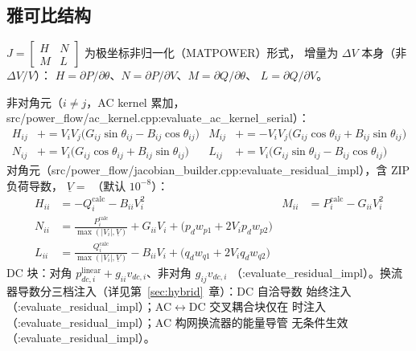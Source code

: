 \subsection{雅可比结构}
$J=\begin{bmatrix}H&N\\ M&L\end{bmatrix}$ 为极坐标非归一化（MATPOWER）形式，
增量为 $\Delta V$ 本身（非 $\Delta V/V$）：
$H=\partial P/\partial\theta$、$N=\partial P/\partial V$、$M=\partial Q/\partial\theta$、
$L=\partial Q/\partial V$。

非对角元（$i\neq j$，AC kernel 累加，src/power\_flow/ac\_kernel.cpp:evaluate\_ac\_kernel\_serial）：
\begin{align*}
H_{ij}&\mathrel{+}=V_iV_j\big(G_{ij}\sin\theta_{ij}-B_{ij}\cos\theta_{ij}\big) &
M_{ij}&\mathrel{+}=-V_iV_j\big(G_{ij}\cos\theta_{ij}+B_{ij}\sin\theta_{ij}\big)\\
N_{ij}&\mathrel{+}=V_i\big(G_{ij}\cos\theta_{ij}+B_{ij}\sin\theta_{ij}\big) &
L_{ij}&\mathrel{+}=V_i\big(G_{ij}\sin\theta_{ij}-B_{ij}\cos\theta_{ij}\big)
\end{align*}
对角元（src/power\_flow/jacobian\_builder.cpp:evaluate\_residual\_impl），含 ZIP 负荷导数，
$\underline V=$ （默认 $10^{-8}$）：
\begin{align*}
H_{ii}&=-Q_i^{\mathrm{calc}}-B_{ii}V_i^2 &
M_{ii}&=P_i^{\mathrm{calc}}-G_{ii}V_i^2\\
N_{ii}&=\frac{P_i^{\mathrm{calc}}}{\max(|V_i|,\underline V)}+G_{ii}V_i+\big(p_dw_{p1}+2V_ip_dw_{p2}\big)\\
L_{ii}&=\frac{Q_i^{\mathrm{calc}}}{\max(|V_i|,\underline V)}-B_{ii}V_i+\big(q_dw_{q1}+2V_iq_dw_{q2}\big)
\end{align*}
DC 块：对角 $p_{dc,i}^{\mathrm{linear}}+g_{ii}v_{dc,i}$、非对角 $g_{ij}v_{dc,i}$
（:evaluate\_residual\_impl）。换流器导数分三档注入（详见第~\ref{sec:hybrid}~章）：DC 自洽导数
始终注入（:evaluate\_residual\_impl）；AC$\leftrightarrow$DC 交叉耦合块仅在
 时注入（:evaluate\_residual\_impl）；AC 构网换流器的能量导管
无条件生效（:evaluate\_residual\_impl）。


